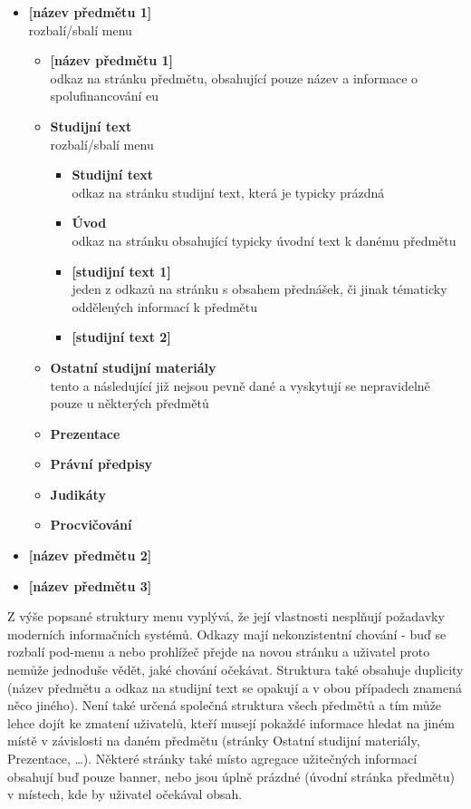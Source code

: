 \begin{itemize}
  \item \textbf{[název předmětu 1]} \hfill \\
    rozbalí/sbalí menu
  \begin{itemize}
    \item \textbf{[název předmětu 1]} \hfill \\
      odkaz na stránku předmětu, obsahující pouze název a informace o spolufinancování \gls{eu}
    \item \textbf{Studijní text} \hfill \\
      rozbalí/sbalí menu
      \begin{itemize}
        \item \textbf{Studijní text} \hfill \\
          odkaz na stránku studijní text, která je typicky prázdná
        \item \textbf{Úvod} \hfill \\
          odkaz na stránku obsahující typicky úvodní text k danému předmětu
        \item \textbf{[studijní text 1]} \hfill \\
          jeden z odkazů na stránku s obsahem přednášek, či jinak tématicky oddělených informací k předmětu
        \item \textbf{[studijní text 2]}
      \end{itemize}
    \item \textbf{Ostatní studijní materiály} \hfill \\
      tento a následující již nejsou pevně dané a vyskytují se nepravidelně pouze u některých předmětů
    \item \textbf{Prezentace}
    \item \textbf{Právní předpisy}            
    \item \textbf{Judikáty}
    \item \textbf{Procvičování}        
  \end{itemize}
  \item \textbf{[název předmětu 2]}
  \item \textbf{[název předmětu 3]}
\end{itemize}

Z výše popsané struktury menu vyplývá, že její vlastnosti nesplňují požadavky moderních informačních systémů. Odkazy mají nekonzistentní chování - buď se rozbalí pod-menu a nebo prohlížeč přejde na novou stránku a uživatel proto nemůže jednoduše vědět, jaké chování očekávat. Struktura také obsahuje duplicity (název předmětu a odkaz na studijní text se opakují a v obou případech znamená něco jiného). Není také určená společná struktura všech předmětů a tím může lehce dojít ke zmatení uživatelů, kteří musejí pokaždé informace hledat na jiném místě v závislosti na daném předmětu (stránky Ostatní studijní materiály, Prezentace, \dots). Některé stránky také místo agregace užitečných informací obsahují buď pouze banner, nebo jsou úplně prázdné (úvodní stránka předmětu) v místech, kde by uživatel očekával obsah.

